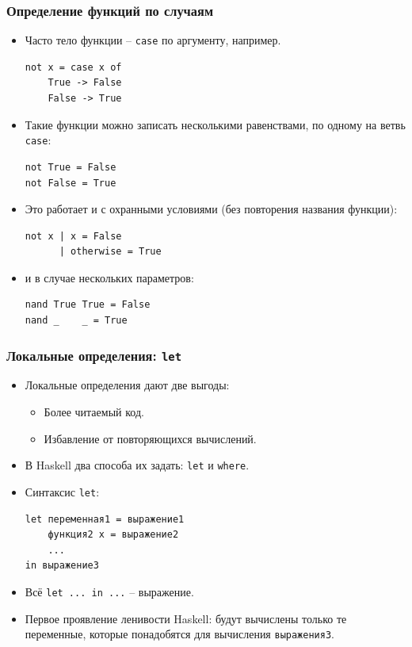 \documentclass[10pt]{beamer}
\begin{document}
\begin{frame}[fragile]
\frametitle{Определение функций по случаям}
\begin{itemize}
    \item Часто тело функции -- \lstinline|case| по аргументу, например.
\begin{lstlisting}[basicstyle=\ttfamily\small]
not x = case x of
    True -> False
    False -> True
\end{lstlisting}
\item Такие функции можно записать несколькими равенствами, по одному на ветвь \lstinline|case|:
\begin{lstlisting}[basicstyle=\ttfamily\small]
not True = False
not False = True
\end{lstlisting}
\item Это работает и с охранными условиями (без повторения названия функции):
\begin{lstlisting}[basicstyle=\ttfamily\small]
not x | x = False
      | otherwise = True
\end{lstlisting}
\item и в случае нескольких параметров:
\begin{lstlisting}[basicstyle=\ttfamily\small]
nand True True = False
nand _    _ = True
\end{lstlisting}
\end{itemize}
\end{frame}

\begin{frame}[fragile]
\frametitle{Локальные определения: \lstinline[basicstyle=\ttfamily]|let|}
\begin{itemize}
    \item Локальные определения дают две выгоды:
    \begin{itemize}
        \item Более читаемый код.
        \item Избавление от повторяющихся вычислений.
    \end{itemize}
    \item В Haskell два способа их задать: \lstinline|let| и \lstinline|where|.
    \item Синтаксис \lstinline|let|:
\begin{lstlisting}
let переменная1 = выражение1
    функция2 x = выражение2
    ...
in выражение3
\end{lstlisting}
    \item Всё \lstinline|let ... in ...| -- выражение.
    \item Первое проявление ленивости Haskell: будут вычислены только те переменные, которые понадобятся для вычисления \lstinline|выражения3|.
\end{itemize}
\end{frame}
\end{document}
